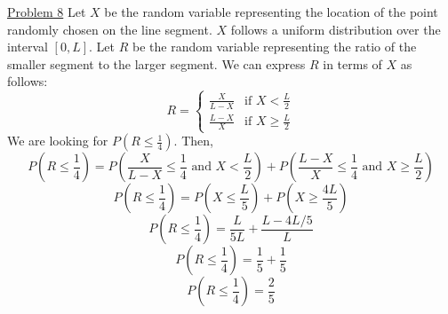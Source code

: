 \documentclass{exam}
\begin{document}
\underline{Problem 8}
\newline
\newline
Let $X$ be the random variable representing the location of the point randomly chosen on the line segment. $X$ follows a uniform distribution over the interval $[0,L]$. Let $R$ be the random variable representing the ratio of the smaller segment to the larger segment. We can express $R$ in terms of $X$ as follows:
\[R = \begin{cases}
\frac{X}{L-X} & \text{if } X < \frac{L}{2} \\
\frac{L-X}{X} & \text{if } X \geq \frac{L}{2}
\end{cases}\]
We are looking for $P(R\le\frac{1}{4})$. Then,
\[P(R\le\frac{1}{4}) = P\left(\frac{X}{L-X}\le\frac{1}{4}\text{ and }X<\frac{L}{2}\right)+P\left(\frac{L-X}{X}\le\frac{1}{4}\text{ and }X\ge\frac{L}{2}\right)\]
\[P(R\le\frac{1}{4}) = P\left(X\le\frac{L}{5}\right)+P\left(X\ge\frac{4L}{5}\right)\]
\[P(R\le\frac{1}{4}) = \frac{L}{5L}+\frac{L-4L/5}{L}\]
\[P(R\le\frac{1}{4}) = \frac{1}{5}+\frac{1}{5}\]
\[P(R\le\frac{1}{4}) = \frac{2}{5}\]
\newline
\end{document}
